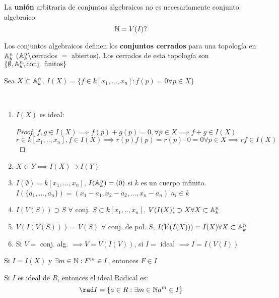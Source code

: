 \begin{obs}
    La \textbf{unión} arbitraria de conjuntos algebraicos no es necesariamente conjunto algebraico:
    \[
        \mathbb{N}=V(I)?
    \]
\end{obs}
\begin{obs}
    Los conjuntos algebraicos definen los \textbf{conjuntos cerrados} para una topología en $\mathbb{A}_k^n$ ($\mathbb{A}_k^n\setminus$cerrados $=$ abiertos). Los cerrados de esta topología son $\{\emptyset,\mathbb{A}_k^n, \text{conj. finitos}\}$
\end{obs}
\begin{defn}
    Sea $X\subset\mathbb{A}_k^n$. $I(X)=\{f\in k[x_1,...,x_n]: f(p)=0\forall p\in X\}$
\end{defn}
\begin{ppty}
    \
    \begin{enumerate}
        \item $I(X)$ es ideal:
              \begin{proof}
                  $f,g\in I(X)\implies f(p)+g(p)=0,\forall p\in X\implies f+g\in I(X)$\\
                  $r\in k[x_1,..,x_n], f\in I(X)\implies r(p)f(p)=r(p)\cdot 0=0\forall p\in X\implies rf\in I(X)$
              \end{proof}
        \item $X\subset Y\implies I(X)\supset I(Y)$
        \item $I(\emptyset)=k[x_1,...,x_n]$, $I(\mathbb{A}_k^n)=(0)$ si $k$ es un cuerpo infinito. $I(\{a_1,...,a_n\})=(x_1-a_1,x_2-a_2,...,x_n-a_n)$ $a_i\in k$
        \item $I(V(S))\supset S$ $\forall$ conj. $S\subset k[x_1,..,x_n]$, $V(I(X))\supset X\forall X\subset \mathbb{A}_k^n$
        \item $V(I(V(S)))=V(S)$ $\forall$ conj. de pol. $S$, $I(V(I(X)))=I(X)\forall X\subset\mathbb{A}_k^n$
        \item Si $V=$ conj. alg. $\implies V=V(I(V))$, si $I=$ ideal $\implies I=I(V(I))$
    \end{enumerate}
\end{ppty}
\begin{obs}
    Si $I=I(X)$ y $\exists m\in\mathbb{N}: F^m\in I$, entonces $F\in I$
\end{obs}

\begin{defn}
    Si $I$ es ideal de $R$, entonces el ideal Radical es:
    \[
        \rad I=\{a\in R: \exists m\in\set{N} a^m\in I\}
    \]
\end{defn}

